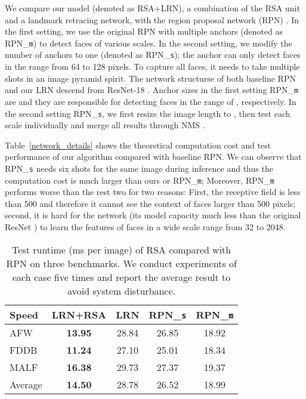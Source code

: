 \documentclass[10pt,twocolumn,letterpaper]{article}
\begin{document}
We compare our model (denoted as RSA+LRN), a combination of the RSA unit and a landmark retracing network,  with the 
region proposal network (RPN) \cite{faster_rcnn}.
In the first setting, we use the original RPN with multiple anchors (denoted as RPN\_\texttt{m}) to detect faces of various scales. 
In the second setting, we modify the number of anchors to one (denoted as RPN\_\texttt{s}); the anchor can only detect faces in the range from 64 to 128 pixels. 
To capture all faces, it needs to take multiple shots in an image pyramid spirit. 
The network structurse of both baseline RPN and our LRN descend from ResNet-18 \cite{resNet}.
Anchor sizes in the first setting RPN\_\texttt{m} are
 and they are responsible for detecting faces in the range of , respectively.
In the second setting
RPN\_\texttt{s}, 
we first resize the image length to , then test each scale individually and merge all results through NMS \cite{pami_nms}.

Table~\ref{network_details} shows the theoretical computation cost and test performance of our algorithm compared with baseline RPN. 
We can observe that
RPN\_\texttt{s} needs six shots for the same image during inference and thus the computation cost is much larger than ours or RPN\_\texttt{m};
Moreover, RPN\_\texttt{m} performs worse than the rest two for two reasons:
First,
the receptive field is less than 500 and therefore it cannot see the context of faces larger than 500 pixels; second, it is hard for the network (its model capacity much less than the original ResNet \cite{resNet}) to learn the features of faces in a wide scale range from 32 to 2048.



\begin{table}[t]
	\caption{Test runtime (ms per image) of RSA compared with RPN on three benchmarks. We conduct experiments of each case five times and report the average result
to avoid system disturbance. }
	\vspace{-.2cm}
\begin{center}
	\footnotesize{
\begin{tabular}{ l|c|c c c}
\toprule
 Speed  & LRN+RSA & LRN & RPN\_\texttt{s} & RPN\_\texttt{m} \\
\midrule
AFW & \textbf{13.95} & 28.84 & 26.85 & 18.92 \\
FDDB & \textbf{11.24} & 27.10 & 25.01 & 18.34 \\
MALF & \textbf{16.38} & 29.73 & 27.37  & 19.37 \\
\midrule
Average & \textbf{14.50} & 28.78 & 26.52 & 18.99 \\
\bottomrule
\end{tabular}
}
\end{center}
\vspace{-.4cm}
\label{testing_time}
\end{table}
\end{document}
